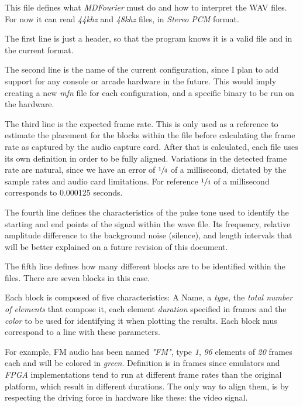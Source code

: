 \documentclass[10pt,a4paper]{report}
\begin{document}
This file defines what \textit{MDFourier} must do and how to interpret the WAV files. For now it can read \textit{44khz} and \textit{48khz} files, in \textit{Stereo PCM} format.

The first line is just a header, so that the program knows it is a valid file and in the current format.

The second line is the name of the current configuration, since I plan to add support for any console or arcade hardware in the future. This would imply creating a new \textit{mfn} file for each configuration, and a specific binary to be run on the hardware.

The third line is the expected frame rate. This is only used as a reference to estimate the placement for the blocks within the file before calculating the frame rate as captured by the audio capture card. After that is calculated, each file uses its own definition in order to be fully aligned. Variations in the detected frame rate are natural, since we have an error of $\sfrac{1}{4}$ of a millisecond, dictated by the sample rates and audio card limitations. For reference $\sfrac{1}{4}$ of a millisecond corresponds to 0.000125 seconds.

The fourth line defines the characteristics of the pulse tone used to identify the starting and end points of the signal within the wave file. Its frequency, relative amplitude difference to the background noise (silence), and length intervals that will be better explained on a future revision of this document.

The fifth line defines how many different blocks are to be identified within the files. There are seven blocks in this case.

Each block is composed of five characteristics: A Name, a \textit{type}, the \textit{total number of elements} that compose it, each element \textit{duration} specified in frames and the \textit{color} to be used for identifying it when plotting the results. Each block mus correspond to a line with these parameters.

For example, FM audio has been named \textit{"FM"}, type \textit{1}, \textit{96} elements of \textit{20} frames each and will be colored in \textit{green}. Definition is in frames since emulators and \textit{FPGA} implementations tend to run at different frame rates than the original platform, which result in different durations. The only way to align them, is by respecting the driving force in hardware like these: the video signal.
\end{document}
